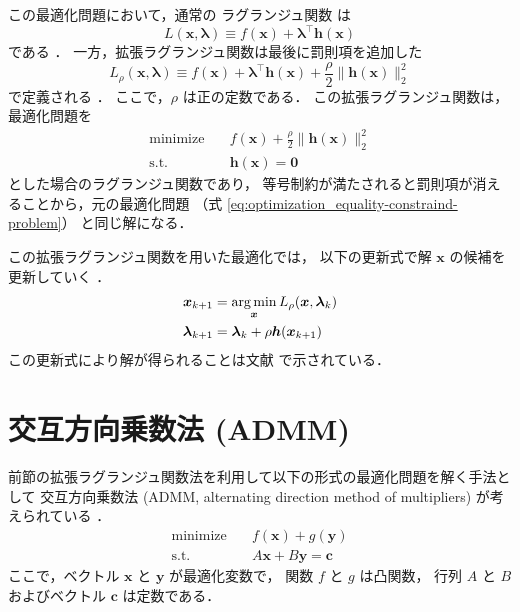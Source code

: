 この最適化問題において，通常の
ラグランジュ関数
は
\begin{equation}
    L(\bm{x}, \bm{\lambda}) \equiv f(\bm{x}) + \bm{\lambda}^\top \bm{h}(\bm{x})
\end{equation}
である \cite{Boyd2010, Hisano2012}．
一方，拡張ラグランジュ関数は最後に罰則項を追加した
\begin{equation}
    L_{\rho}(\bm{x}, \bm{\lambda}) \equiv f(\bm{x}) + \bm{\lambda}^\top \bm{h}(\bm{x})
    + \frac{\rho}{2}\|\bm{h}(\bm{x})\|_2^2
\end{equation}
で定義される \cite{Boyd2010, Hisano2012}．
ここで，$\rho$ は正の定数である．
この拡張ラグランジュ関数は，最適化問題を
\begin{equation}
    \begin{aligned}
        \text{minimize} \hspace{1em} & f(\bm{x})  + \frac{\rho}{2}\|\bm{h}(\bm{x})\|_2^2 \\
        \text{s.t.} \hspace{1em}     & \bm{h}(\bm{x}) = \bm{0}
    \end{aligned}
\end{equation}
とした場合のラグランジュ関数であり，
等号制約が満たされると罰則項が消えることから，元の最適化問題
（式 \eqref{eq:optimization_equality-constraind-problem}）
と同じ解になる．

この拡張ラグランジュ関数を用いた最適化では，
以下の更新式で解 $\bm{x}$ の候補を更新していく \cite{Boyd2010, Hisano2012}．
\begin{align}
    \bm{x}_{k+1}       & = \operatorname*{arg \thinspace min}_{\bm{x}} L_{\rho}(\bm{x}, \bm{\lambda}_{k}) \\
    \bm{\lambda}_{k+1} & = \bm{\lambda}_k + \rho \bm{h}(\bm{x}_{k+1})
\end{align}
この更新式により解が得られることは文献 \cite{Ito2008} で示されている．

\section{交互方向乗数法 (ADMM)}

前節の拡張ラグランジュ関数法を利用して以下の形式の最適化問題を解く手法として
交互方向乗数法 (ADMM, alternating direction method of multipliers)
が考えられている \cite{Boyd2010, Hisano2012}．
\begin{equation}
    \begin{aligned}
        \text{minimize} \hspace{1em} & f(\bm{x}) + g(\bm{y})        \\
        \text{s.t.} \hspace{1em}     & A \bm{x} + B \bm{y} = \bm{c}
    \end{aligned}
\end{equation}
ここで，ベクトル $\bm{x}$ と $\bm{y}$ が最適化変数で，
関数 $f$ と $g$ は凸関数，
行列 $A$ と $B$ およびベクトル $\bm{c}$ は定数である．

